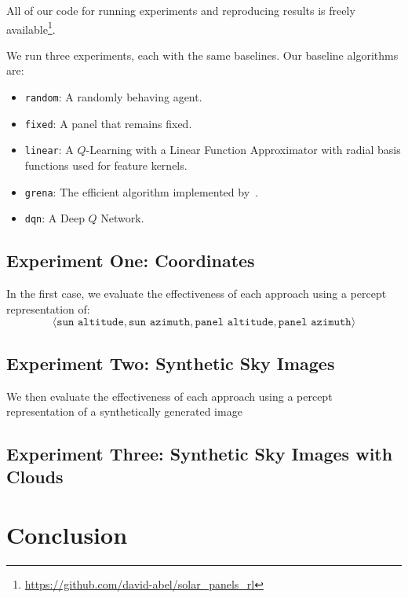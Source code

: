 \documentclass[11pt]{article}
\begin{document}
All of our code for running experiments and reproducing results is freely available\footnote{\url{https://github.com/david-abel/solar_panels_rl}}.

We run three experiments, each with the same baselines. Our baseline algorithms are:
\begin{itemize}
\item \texttt{random}: A randomly behaving agent.
\item \texttt{fixed}: A panel that remains fixed.
\item \texttt{linear}: A $Q$-Learning with a Linear Function Approximator with radial basis functions used for feature kernels.
\item \texttt{grena}: The efficient algorithm implemented by~\citet{Grena2008}.
\item \texttt{dqn}: A Deep $Q$ Network.
\end{itemize}

\subsection{Experiment One: Coordinates}

In the first case, we evaluate the effectiveness of each approach using a percept representation of:
\begin{equation}
\langle \texttt{sun altitude}, \texttt{sun azimuth}, \texttt{panel altitude}, \texttt{panel azimuth} \rangle
\end{equation}

\subsection{Experiment Two: Synthetic Sky Images}

We then evaluate the effectiveness of each approach using a percept representation of a synthetically generated image

\subsection{Experiment Three: Synthetic Sky Images with Clouds}




\section{Conclusion}


















\end{document}
